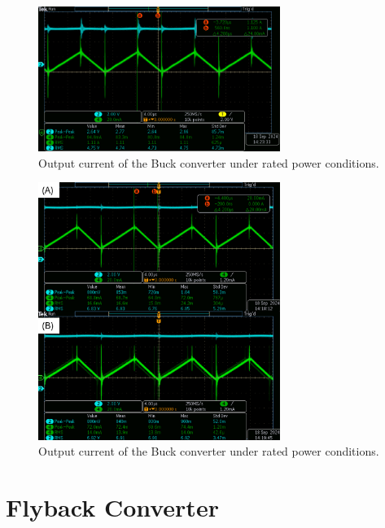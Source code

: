 \documentclass[12pt,twoside]{scrartcl}
\begin{document}
\begin{figure}[htp]
    \centering
    \includegraphics[width=0.7\textwidth]{buck_expI}
    \caption{Output current of the Buck converter under rated power conditions.}
    \label{fig:buck_expI}
\end{figure}

\begin{figure}[htp]
    \centering
    \includegraphics[width=0.7\textwidth]{buck_expI_DCM}
    \caption{Output current of the Buck converter under rated power conditions.}
    \label{fig:buck_expI_DCM}
\end{figure}
\newpage
\section{Flyback Converter}
\end{document}
